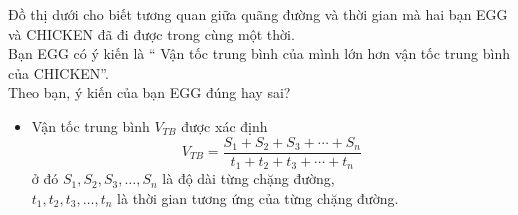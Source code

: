 \begin{bt}%
Đồ thị dưới cho biết tương quan giữa quãng đường và thời gian mà hai bạn EGG và CHICKEN đã đi được trong cùng một thời.\\ 
Bạn EGG có ý kiến là `` Vận tốc trung bình của mình lớn hơn vận tốc trung bình của CHICKEN''.\\
Theo bạn, ý kiến của bạn EGG đúng hay sai?
\end{bt}
\begin{note}
	\begin{itemize}
		\item Vận tốc trung bình $V_{TB}$ được xác định  
		$$ V_{TB}= \dfrac{S_{1} + S_{2} + S_{3} + \cdots + S_{n} }{t_{1}+ t_{2}+ t_{3}+ \cdots + t_{n}}$$
	ở đó $S_{1}, S_{2},S_{3},\ldots, S_{n}$ là độ dài  từng chặng đường,\\
	 $t_{1}, t_{2}, t_{3},\ldots, t_{n}$ là thời gian tương ứng của từng chặng đường.	
   \end{itemize}
\end{note}
